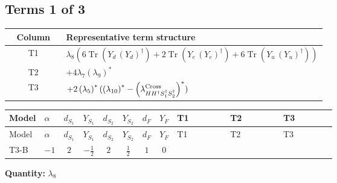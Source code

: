 \documentclass[8pt]{article}
\begin{document}
\begin{landscape}
\subsection*{Terms 1 of 3}
\begin{center}
\begin{tabular}{@{}c >{\raggedright\arraybackslash}p{0.82\linewidth}@{}}
\toprule
Column & Representative term structure \\
\midrule
T1 & \(\displaystyle {\lambda_8} (6 \operatorname{Tr}\!\left({Y_d}\,\left({Y_d}\right)^{\dagger}\right)+2 \operatorname{Tr}\!\left({Y_e}\,\left({Y_e}\right)^{\dagger}\right)+6 \operatorname{Tr}\!\left({Y_u}\,\left({Y_u}\right)^{\dagger}\right))\) \\
\midrule
T2 & \(\displaystyle +4 {\lambda_7} \left({\lambda_9}\right)^{*}\) \\
\midrule
T3 & \(\displaystyle +2 \left({\lambda_5}\right)^{*} (\left({\lambda_{10}}\right)^{*}-\left({\lambda_{H H^\dagger S_1^\dagger S_2^\dagger}^{\rm Cross}}\right)^{*})\) \\
\midrule
\bottomrule
\end{tabular}
\end{center}
\smallskip
\tiny
\begin{longtable}{@{}llcccccc >{\raggedright\arraybackslash}p{0.21\linewidth} >{\raggedright\arraybackslash}p{0.21\linewidth} >{\raggedright\arraybackslash}p{0.21\linewidth}@{}}
\toprule
Model & $\alpha$ & $d_{S_1}$ & $Y_{S_1}$ & $d_{S_2}$ & $Y_{S_2}$ & $d_F$ & $Y_F$ & T1 & T2 & T3 \\
\midrule
\endfirsthead
\toprule
Model & $\alpha$ & $d_{S_1}$ & $Y_{S_1}$ & $d_{S_2}$ & $Y_{S_2}$ & $d_F$ & $Y_F$ & T1 & T2 & T3 \\
\midrule
\endhead
T3-B & $-1$ & $2$ & $-\frac{1}{2}$ & $2$ & $\frac{1}{2}$ & $1$ & $0$ & \scriptsize\adjustbox{max width=\linewidth}{$\begin{gathered} {\lambda_8} (6 \operatorname{Tr}\!\left({Y_d}\,\left({Y_d}\right)^{\dagger}\right)+2 \operatorname{Tr}\!\left({Y_e}\,\left({Y_e}\right)^{\dagger}\right)+6 \operatorname{Tr}\!\left({Y_u}\,\left({Y_u}\right)^{\dagger}\right))\end{gathered}$} & \scriptsize\adjustbox{max width=\linewidth}{$\begin{gathered} +4 {\lambda_7} \left({\lambda_9}\right)^{*}\end{gathered}$} & \scriptsize\adjustbox{max width=\linewidth}{$\begin{gathered} +2 \left({\lambda_5}\right)^{*} (\left({\lambda_{10}}\right)^{*}-\left({\lambda_{H H^\dagger S_1^\dagger S_2^\dagger}^{\rm Cross}}\right)^{*})\end{gathered}$} \\
\midrule
\bottomrule
\end{longtable}
\clearpage
\noindent\textbf{Quantity: }$\lambda_{8}$\par\smallskip

\end{landscape}
\end{document}
